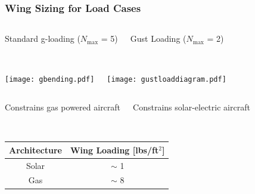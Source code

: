 \documentclass{beamer}
\begin{document}
\begin{frame}
    \frametitle{Wing Sizing for Load Cases}
      
    \begin{columns}
        \begin{center}
        Standard g-loading ($N_{\text{max}}$ = 5) \\~\\
        \end{center}
        
        \begin{center}
        Gust Loading ($N_{\text{max}}$ = 2) \\~\\
        \end{center}
    \end{columns}

    \begin{columns}
        \texttt{[image: gbending.pdf]}
        
        \texttt{[image: gustloaddiagram.pdf]}
    \end{columns}
    
    \pause
    \begin{columns}
        \begin{center}
        Constrains gas powered aircraft \\~\\
        \end{center}
        
        \begin{center}
        Constrains solar-electric aircraft \\~\\
        \end{center}
    \end{columns}

    \pause
    \begin{table}[]
        \centering
        \begin{tabular}{cc}
            Architecture & Wing Loading [lbs/ft$^2$] \\ \hline
            Solar        & $\sim$ 1                        \\
            Gas          & $\sim$ 8                       
        \end{tabular}
    \end{table}
\end{frame}
\end{document}
